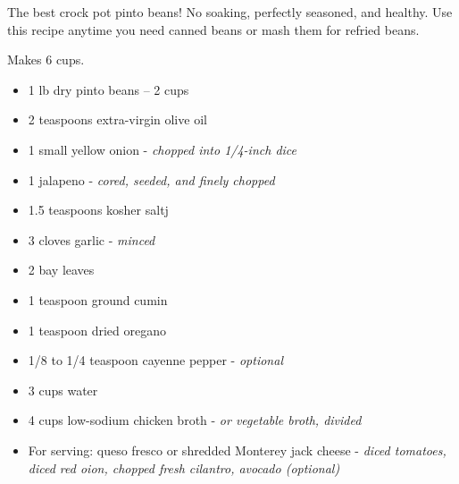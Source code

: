 
The best crock pot pinto beans! No soaking, perfectly seasoned, and healthy.
Use this recipe anytime you need canned beans or mash them for refried beans.

Makes 6 cups.

\ingredients
\begin{itemize}
		\item 1 lb dry pinto beans -- 2 cups
		\item 2 teaspoons extra-virgin olive oil
		\item 1 small yellow onion - \textit{chopped into 1/4-inch dice}
		\item 1 jalapeno - \textit{cored, seeded, and finely chopped}
		\item 1.5 teaspoons kosher saltj
		\item 3 cloves garlic - \textit{minced}
		\item 2 bay leaves
		\item 1 teaspoon ground cumin
		\item 1 teaspoon dried oregano
		\item 1/8 to 1/4 teaspoon cayenne pepper - \textit{optional}
		\item 3 cups water
		\item 4 cups low-sodium chicken broth - \textit{or vegetable broth, divided}
		\item For serving: queso fresco or shredded Monterey jack cheese - \textit{diced tomatoes, diced red oion, chopped fresh cilantro, avocado (optional)}
\end{itemize}


